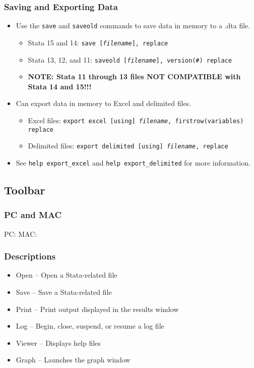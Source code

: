 \documentclass{beamer}
\begin{document}
\begin{frame}
	\frametitle{Saving and Exporting Data}
		\begin{itemize}
			\item Use the \texttt{save} and \texttt{saveold} commands to save data in memory to a .dta file.
				\begin{itemize}
					\item Stata 15 and 14: \texttt{save [\textit{filename}], replace}
					\item Stata 13, 12, and 11: \texttt{saveold [\textit{filename}], version(\#) replace}
					\item \textbf{NOTE: Stata 11 through 13 files NOT COMPATIBLE with Stata 14 and 15!!!}
				\end{itemize}
			\item Can export data in memory to Excel and delimited files.
			\begin{itemize}
				\item Excel files: \texttt{export excel [using] \textit{filename}, firstrow(variables) replace}
				\item Delimited files: \texttt{export delimited [using] \textit{filename}, replace}
			\end{itemize}
			\item See \texttt{help export\_{excel}} and \texttt{help export\_{delimited}} for more information.
		\end{itemize}
\end{frame}

\subsection{Toolbar}

\begin{frame}
	\frametitle{PC and MAC}
		PC: %
		MAC: %
\end{frame}

\begin{frame}
	\frametitle{Descriptions}
		\begin{itemize}
			\item Open -- Open a Stata-related file
			\item Save -- Save a Stata-related file
			\item Print -- Print output displayed in the results window
			\item Log -- Begin, close, suspend, or resume a log file
			\item Viewer -- Displays help files
			\item Graph -- Launches the graph window
		\end{itemize}
\end{frame}
\end{document}
